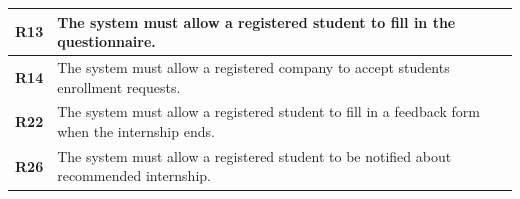 \begin{table}[H]
\begin{tabular}{|l|m{10cm}|}
        \hline \textbf{R13} & The system must allow a registered student to fill in the questionnaire. \\
        \hline \textbf{R14} & The system must allow a registered company to accept students enrollment requests. \\
        \hline \textbf{R22} & The system must allow a registered student to fill in a feedback form when the internship ends. \\
        \hline \textbf{R26} & The system must allow a registered student to be notified about recommended internship. \\
        \hline
    \end{tabular}
\end{table}

